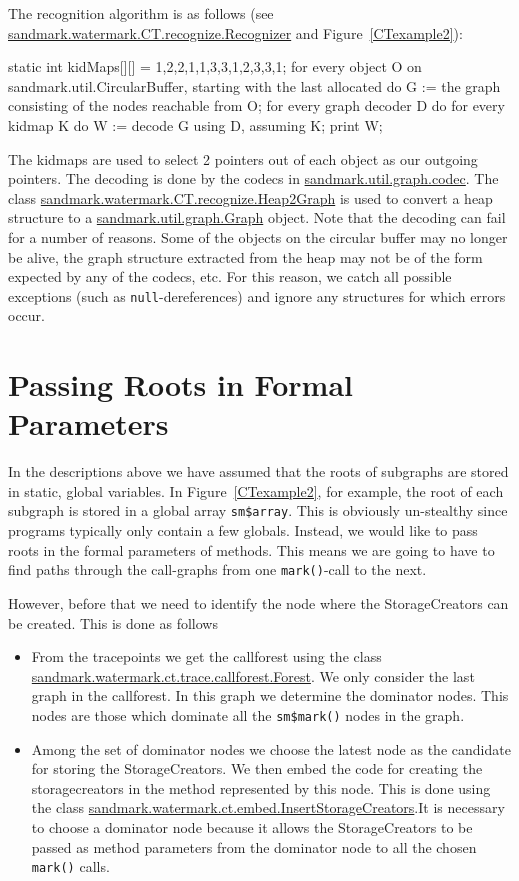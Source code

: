 The recognition algorithm is as follows (see \url{sandmark.watermark.CT.recognize.Recognizer} and Figure~\ref{CTexample2}):
\begin{listing}{1}
   static int kidMaps[][] = {{1,2},{2,1},{1,3},{3,1},{2,3},{3,1}};
   for every object O on sandmark.util.CircularBuffer, starting with the last allocated do {
       G := the graph consisting of the nodes reachable from O;
       for every graph decoder D do {
          for every kidmap K do {
             W := decode G using D, assuming K;
             print W;
          }
       }
   }
\end{listing}
The kidmaps are used to select 2 pointers out of each
object as our outgoing pointers. The decoding is done
by the codecs in \url{sandmark.util.graph.codec}. The class 
\url{sandmark.watermark.CT.recognize.Heap2Graph} is used to convert
a heap structure to a \url{sandmark.util.graph.Graph}
object. Note that the decoding can fail for a number 
of reasons. Some of the objects on the circular buffer
may no longer be alive, the graph structure extracted
from the heap may not be of the form expected by any
of the codecs, etc. For this reason, we catch all 
possible exceptions (such as {\tt null}-dereferences)
and ignore any structures for which errors occur.


\section{Passing Roots in Formal Parameters}
\label{CTFormals}
In the descriptions above we have assumed that
the roots of subgraphs are stored in static,
global variables. In Figure~\ref{CTexample2}, 
for example, the root of each subgraph is stored
in a global array {\tt sm\$array}. This is obviously 
un-stealthy since programs typically only contain 
a few globals. Instead, we would like to pass 
roots in the formal parameters of methods.
This means we are going to have to find paths
through the call-graphs from one {\tt mark()}-call
to the next.

However, before that we need to identify the node where the StorageCreators can be created. This is
done as follows 
\begin{itemize}
\item  From the tracepoints we get the callforest using the class \url{sandmark.watermark.ct.trace.callforest.Forest}. 
 We only consider the last graph in the callforest. In this graph we determine the dominator nodes. This nodes are those which dominate all the {\tt sm\$mark()} nodes in the graph. 
\item  Among the set of dominator nodes we choose the latest node as the candidate for storing the StorageCreators. We then embed the code for creating the storagecreators in the method represented by this node. This is done using the class \url{sandmark.watermark.ct.embed.InsertStorageCreators}.It is necessary to choose a dominator node  because it allows the StorageCreators to be passed as method parameters from the dominator node to all the chosen {\tt mark()} calls.
\end{itemize}

